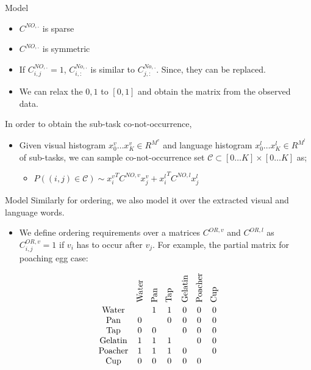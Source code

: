 \begin{frame}{Model}
\begin{itemize}
\item $C^{NO,.}$ is sparse
\item $C^{NO,.}$ is symmetric
\item If $C^{NO,.}_{i,j}=1$, $C^{No,.}_{i,:}$ is similar to  $C^{No,.}_{j,:}$. Since, they can be replaced.
\item We can relax the ${0,1}$ to $[0,1]$ and obtain the matrix from the observed data.
\end{itemize}
In order to obtain the sub-task co-not-occurrence,
\begin{itemize}
\item Given visual histogram $x^v_0 \ldots x^v_K \in R^{M^v}$ and language histogram $x^l_0 \ldots x^l_K \in R^{M^l}$ of sub-tasks, we can sample co-not-occurrence set $\mathcal{C} \subset [0\ldots K]
 \times [0 \ldots K]$ as;
\begin{itemize}
\item $P((i,j) \in \mathcal{C}) \sim {x^v_i}^T C^{NO,v} x^v_j + {x^l_i}^T C^{NO,l} x^l_j$
\end{itemize} 
\end{itemize}
\end{frame}


\begin{frame}{Model}
Similarly for ordering, we also model it over the extracted visual and language words.
\begin{itemize}
\item We define ordering requirements over a matrices $C^{OR,v}$ and $C^{OR,l}$ as $C^{OR,v}_{i,j} =1$ if $v_i$ has to occur after $v_j$. For example, the partial matrix for poaching egg case:
\end{itemize}
\[
 \begin{array}{ccccccc} 
&\rotatebox{90}{Water} & \rotatebox{90}{Pan} & \rotatebox{90}{Tap} & \rotatebox{90}{Gelatin} & \rotatebox{90}{Poacher} & \rotatebox{90}{Cup} \\ 
\text{Water} &  & 1 & 1 & 0 & 0 & 0 \\
\text{Pan} & 0 &  & 0 & 0 & 0 & 0 \\
\text{Tap} & 0 & 0 &  & 0 & 0 & 0 \\
\text{Gelatin} & 1 & 1 & 1 &  & 0 & 0 \\
\text{Poacher} & 1 & 1 & 1 & 0 &  & 0 \\
\text{Cup} & 0 & 0 & 0 & 0 & 0 & 
\end{array} 
\]
\end{frame}

